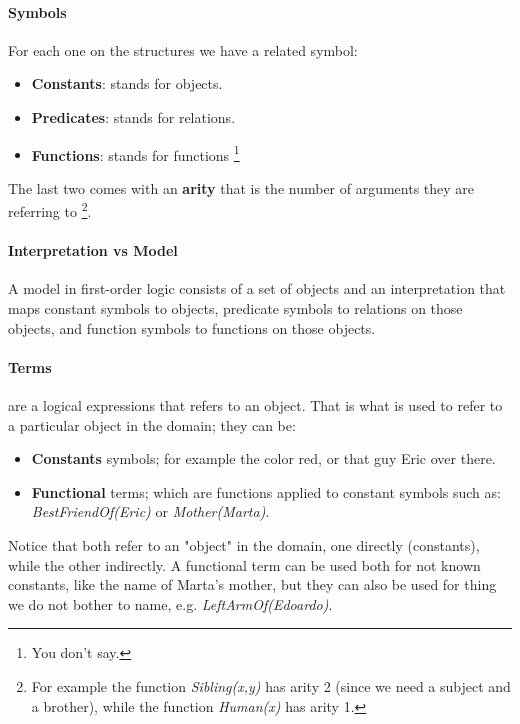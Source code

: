 \documentclass[10pt,a4paper]{article}
\begin{document}
\paragraph{Symbols} For each one on the structures we have a related symbol:
\begin{itemize}
\item \textbf{Constants}: stands for objects.
\item \textbf{Predicates}: stands for relations.
\item \textbf{Functions}: stands for functions \footnote{You don't say.}
\end{itemize}
The last two comes with an \textbf{arity} that is the number of arguments they are referring to \footnote{For example the function \textit{Sibling(x,y)} has arity 2 (since we need a subject and a brother), while the function \textit{Human(x)} has arity 1.}.

\paragraph{Interpretation vs Model}
A model in first-order logic consists of a set of objects and an interpretation that maps constant symbols to objects, predicate symbols to relations on those objects, and function symbols to functions on those objects.

\paragraph{Terms}
are a logical expressions that refers to an object. That is what is used to refer to a particular object in the domain; they can be:
\begin{itemize}
\item \textbf{Constants} symbols; for example the color red, or that guy Eric over there.
\item \textbf{Functional} terms; which are functions applied to constant symbols such as: \textit{BestFriendOf(Eric)} or \textit{Mother(Marta)}.
\end{itemize}
Notice that both refer to an "object" in the domain, one directly (constants), while the other indirectly. A functional term can be used both for not known constants, like the name of Marta's mother, but they can also be used for thing we do not bother to name, e.g. \textit{LeftArmOf(Edoardo)}. 
\end{document}
